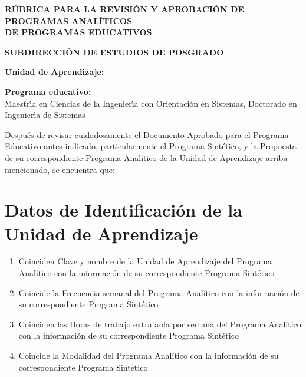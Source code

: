 \documentclass{article}
\newcommand{\sino}{\hfill \CheckBox[checkboxsymbol=\ding{56}]{S\'{i}}\quad\CheckBox[checkboxsymbol=\ding{56}]{No}}
\newcommand{\rsino}{\begin{flushright}\sino\end{flushright}}
\begin{document}
\pagestyle{fancy}

\begin{center}
  {\bf R\'{U}BRICA PARA LA REVISI\'{O}N Y APROBACI\'{O}N DE PROGRAMAS ANAL\'{I}TICOS \\ DE PROGRAMAS EDUCATIVOS}

  {\bf SUBDIRECCI\'{O}N DE ESTUDIOS DE POSGRADO}
\end{center}

\begin{Form}

  {\bf Unidad de Aprendizaje:} \\

  \TextField[name=ua,multiline=false,bordercolor=black,align=0,width=\textwidth,height=7mm,default={Clave y nombre}]{}

{\bf Programa educativo:} \\
  
\ChoiceMenu[print,combo,default=Seleccione,name=pr]{}%
           {Maestr\'{\i}a en Ciencias de la Ingenier\'{\i}a con Orientaci\'{o}n en Sistemas, %
             Doctorado en Ingenier\'{\i}a de Sistemas}

Despu\'{e}s de revisar cuidadosamente el Documento Aprobado para el
Programa Educativo antes indicado, particularmente el Programa
Sint\'{e}tico, y la Propuesta de su correspondiente Programa Anal\'{i}tico de
la Unidad de Aprendizaje arriba mencionado, se encuentra que:

\section{Datos de Identificaci\'{o}n de la Unidad de Aprendizaje}

\begin{enumerate}[leftmargin=*,nolistsep]

\item{Coinciden Clave y nombre de la Unidad de Aprendizaje del
  Programa Anal\'{i}tico con la informaci\'{o}n de su correspondiente
  Programa Sint\'{e}tico \sino}

\item{Coincide la Frecuencia semanal del Programa Anal\'{i}tico con la
  informaci\'{o}n de su correspondiente Programa Sint\'{e}tico \rsino}

\item{Coinciden las Horas de trabajo extra aula por semana del
  Programa Anal\'{i}tico con la informaci\'{o}n de su correspondiente
  Programa Sint\'{e}tico \sino}

\item{Coincide la Modalidad del Programa Anal\'{i}tico con la
  informaci\'{o}n de su correspondiente Programa Sint\'{e}tico \sino}


\end{enumerate}
\end{Form}
\end{document}
